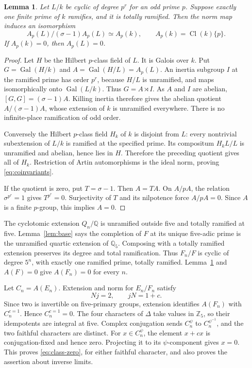 \documentclass[11pt]{article}
\newtheorem{lemma}[theorem]{Lemma}
\newcommand{\Q}{\mathbb Q}
\newcommand{\Z}{\mathbb Z}
\newcommand{\Cl}{\operatorname{Cl}}
\newcommand{\Gal}{\operatorname{Gal}}
\begin{document}
\begin{lemma}\label{lem:coinvariants}
Let $L/k$ be cyclic of degree $p^r$ for an odd prime $p$. Suppose exactly
one finite prime of $k$ ramifies, and it is totally ramified. Then the
norm map induces an isomorphism
\[
 A_p(L)/(\sigma-1)A_p(L)\simeq A_p(k),
 \qquad A_p(k)=\Cl(k)\{p\}.
 \tag{24}\label{eq:coinvariants}
\]
If $A_p(k)=0$, then $A_p(L)=0$.
\end{lemma}
\begin{proof}
Let $H$ be the Hilbert $p$-class field of $L$.
It is Galois over $k$. Put $G=\Gal(H/k)$ and
$A=\Gal(H/L)=A_p(L)$. An inertia subgroup $I$ at the ramified prime
has order $p^r$, because $H/L$ is unramified, and maps isomorphically
onto $\Gal(L/k)$. Thus $G=A\rtimes I$. As $A$ and $I$ are abelian,
$[G,G]=(\sigma-1)A$. Killing inertia therefore gives the abelian
quotient $A/(\sigma-1)A$, whose extension of $k$ is unramified
everywhere. There is no infinite-place ramification of odd order.

Conversely the Hilbert $p$-class field $H_k$ of $k$ is disjoint from
$L$: every nontrivial subextension of $L/k$ is ramified at the specified
prime. Its compositum $H_kL/L$ is unramified and abelian, hence lies
in $H$. Therefore the preceding quotient gives all of $H_k$.
Restriction of Artin automorphisms is the ideal norm, proving
\eqref{eq:coinvariants}.

If the quotient is zero, put $T=\sigma-1$. Then $A=TA$. On $A/pA$,
the relation $\sigma^{p^r}=1$ gives $T^{p^r}=0$.
Surjectivity of $T$ and its nilpotence force $A/pA=0$.
Since $A$ is a finite $p$-group, this implies $A=0$.
\end{proof}

The cyclotomic extension $Q_n/\Q$ is unramified outside five and
totally ramified at five. Lemma~\ref{lem:base} says the completion of
$F$ at its unique five-adic prime is the unramified quartic extension
of $\Q_5$. Composing with a totally ramified extension preserves its
degree and total ramification. Thus $F_n/F$ is cyclic of degree $5^n$,
with exactly one ramified prime, totally ramified.
Lemma~\ref{lem:coinvariants} and $A(F)=0$ give $A(F_n)=0$ for every $n$.

Let $C_n=A(E_n)$. Extension and norm for $E_n/F_n$ satisfy
\[
 Nj=2,\qquad jN=1+c.
 \tag{25}\label{eq:prime-to-five}
\]
Since two is invertible on five-primary groups, extension identifies
$A(F_n)$ with $C_n^{c=1}$. Hence $C_n^{c=1}=0$.
The four characters of $\Delta$ take values in $\Z_5$, so their
idempotents are integral at five. Complex conjugation sends $C_n^\psi$
to $C_n^{\psi^{-1}}$, and the two faithful characters are distinct.
For $x\in C_n^\psi$, the element $x+cx$ is conjugation-fixed and hence
zero. Projecting it to its $\psi$-component gives $x=0$.
This proves \eqref{eq:class-zero}, for either faithful character, and
also proves the assertion about inverse limits.
\end{document}
